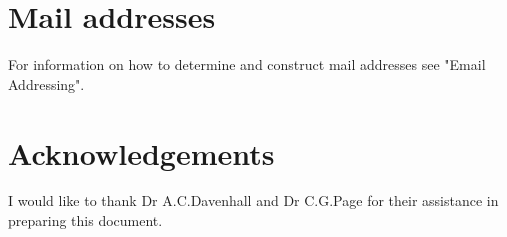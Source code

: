 \documentclass[11pt,nolof]{starlink}
\begin{document}
\section{Mail addresses}

For information on how to determine and construct mail addresses
see  "Email Addressing".

\section{Acknowledgements}

I would like to thank Dr A.C.Davenhall and Dr C.G.Page for their assistance
in preparing this document.
\end{document}
